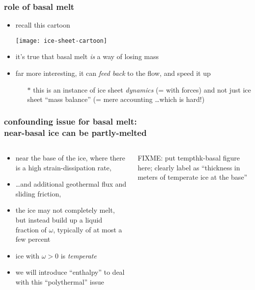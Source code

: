 \documentclass{beamer}
\begin{document}
\begin{frame}
  \frametitle{role of basal melt}
\small
\begin{itemize}
\item recall this cartoon
  \begin{center}
    \texttt{[image: ice-sheet-cartoon]}\\
  \end{center}
\item it's true that basal melt \emph{is} a way of losing mass
\item far more interesting, it can \emph{feed back} to the flow, and speed it up
  \begin{itemize}
  \item[$\ast$] this is an instance of ice sheet \emph{dynamics} (= with forces) and not just ice sheet ``mass balance'' (= mere accounting \dots which is hard!)
  \end{itemize}
\end{itemize}
\end{frame}


\begin{frame}
  \frametitle{confounding issue for basal melt: \\ near-basal ice can be partly-melted}
\begin{columns}
\begin{column}{0.6\textwidth}
  \begin{itemize}
  \item near the base of the ice, where there is a high strain-dissipation rate,
  \item \dots and additional geothermal flux and sliding friction,
  \item the ice may not completely melt, but instead build up a liquid fraction of $\omega$, typically of at most a few percent
  \item ice with $\omega > 0$ is \emph{temperate}
  \item we will introduce ``enthalpy'' to deal with this ``polythermal'' issue
  \end{itemize}
\end{column}
\begin{column}{0.4\textwidth}
FIXME: put tempthk-basal figure here; clearly label as ``thickness in meters of temperate ice at the base''
\end{column}
\end{columns}
\end{frame}
\end{document}

